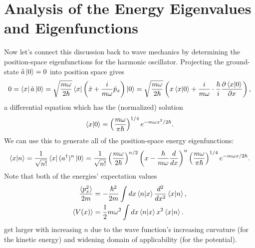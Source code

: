 \documentclass[../p116main.tex]{subfiles}
\begin{document}
\section{Analysis of the Energy Eigenvalues and Eigenfunctions}
Now let's connect this discussion back to wave mechanics by determining the position-space eigenfunctions for the harmonic oscillator.
Projecting the ground-state $\hat a \left| 0 \right> = 0$ into position space gives
\[ 0 = \left< x \right| \hat a \left| 0 \right> = \sqrt{\frac{m\omega}{2\hbar}} \left< x \right| \left( \hat x + \frac{i}{m\omega} \hat p_x \right) \left| 0 \right> = \sqrt{\frac{m\omega}{2\hbar}} \left( x \left< x \middle| 0 \right> + \frac{i}{m\omega} \cdot \frac{\hbar}{i} \frac{\partial \left< x \middle| 0 \right>}{\partial x} \right), \]
a differential equation which has the (normalized) solution
\[ \left< x \middle| 0 \right> = \left( \frac{m\omega}{\pi \hbar} \right)^{1 / 4} e^{-m\omega x^2 / 2\hbar}. \]
We can use this to generate all of the position-space energy eigenfunctions:
\[ \left< x \middle| n \right> = \frac{1}{\sqrt{n!}} \left< x \right| (a^\dagger)^n \left| 0 \right> = \frac{1}{\sqrt{n!}} \left( \frac{m\omega}{2\hbar} \right)^{n / 2} \left( x - \frac{\hbar}{m\omega} \frac{d}{dx} \right)^{n} \left( \frac{m\omega}{\pi \hbar} \right)^{1 / 4} e^{-m\omega x / 2\hbar}. \]
Note that both of the energies' expectation values
\begin{align*}
    \frac{\langle p_x^2 \rangle}{2m} &= -\frac{\hbar^2}{2m} \int dx \left< n \middle| x \right> \frac{d^2}{dx^2} \left< x \middle| n \right>, \\
    \langle V(x) \rangle &= \frac{1}{2} m\omega^2 \int dx \left< n \middle| x \right> x^2 \left< x \middle| n \right>.
\end{align*}
get larger with increasing $n$ due to the wave function's increasing curvature (for the kinetic energy) and widening domain of applicability (for the potential).
\end{document}
